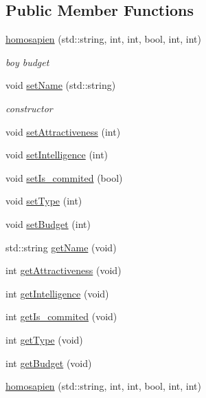 \subsection*{Public Member Functions}
\begin{DoxyCompactItemize}
\item 
\hyperlink{classhomosapien_a102098b80f8af39b27dafdff15d6aeee}{homosapien} (std\+::string, int, int, bool, int, int)
\begin{DoxyCompactList}\small\item\em boy budget \end{DoxyCompactList}\item 
void \hyperlink{classhomosapien_a0b0de2b72513ee20ba408ea29865e5f4}{set\+Name} (std\+::string)
\begin{DoxyCompactList}\small\item\em constructor \end{DoxyCompactList}\item 
void \hyperlink{classhomosapien_a264fd071fc5a6efda03730c34bfbc49c}{set\+Attractiveness} (int)
\item 
void \hyperlink{classhomosapien_adcfb3c7207fd77965679df8b85e5a507}{set\+Intelligence} (int)
\item 
void \hyperlink{classhomosapien_afee55d18c833bdfeac7392843e8580cc}{set\+Is\+\_\+commited} (bool)
\item 
void \hyperlink{classhomosapien_aa868001c96c4c26e5cbe85d7d75c738e}{set\+Type} (int)
\item 
void \hyperlink{classhomosapien_a3ad8cc4965cf29863337d0d56ca87d2d}{set\+Budget} (int)
\item 
std\+::string \hyperlink{classhomosapien_a1e93a89a2490a563289e7ad7a295ff45}{get\+Name} (void)
\item 
int \hyperlink{classhomosapien_a36bfd2262341cc01977ee077a7e5f619}{get\+Attractiveness} (void)
\item 
int \hyperlink{classhomosapien_ab9aa094786987a968b9a156a6d038931}{get\+Intelligence} (void)
\item 
int \hyperlink{classhomosapien_a3264f22c6b40fd138286980a7bafd11e}{get\+Is\+\_\+commited} (void)
\item 
int \hyperlink{classhomosapien_a2157c9d5eeb763c5fde1f42f4a6bb48b}{get\+Type} (void)
\item 
int \hyperlink{classhomosapien_a372c40e87592045235e89956ddda2488}{get\+Budget} (void)
\item 
\hyperlink{classhomosapien_a102098b80f8af39b27dafdff15d6aeee}{homosapien} (std\+::string, int, int, bool, int, int)

\end{DoxyCompactItemize}
